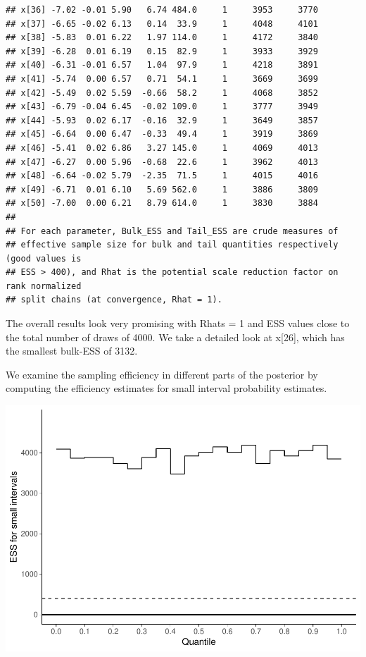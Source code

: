 \documentclass[american,]{article}
\begin{document}
\begin{verbatim}
## x[36] -7.02 -0.01 5.90   6.74 484.0     1     3953     3770
## x[37] -6.65 -0.02 6.13   0.14  33.9     1     4048     4101
## x[38] -5.83  0.01 6.22   1.97 114.0     1     4172     3840
## x[39] -6.28  0.01 6.19   0.15  82.9     1     3933     3929
## x[40] -6.31 -0.01 6.57   1.04  97.9     1     4218     3891
## x[41] -5.74  0.00 6.57   0.71  54.1     1     3669     3699
## x[42] -5.49  0.02 5.59  -0.66  58.2     1     4068     3852
## x[43] -6.79 -0.04 6.45  -0.02 109.0     1     3777     3949
## x[44] -5.93  0.02 6.17  -0.16  32.9     1     3649     3857
## x[45] -6.64  0.00 6.47  -0.33  49.4     1     3919     3869
## x[46] -5.41  0.02 6.86   3.27 145.0     1     4069     4013
## x[47] -6.27  0.00 5.96  -0.68  22.6     1     3962     4013
## x[48] -6.64 -0.02 5.79  -2.35  71.5     1     4015     4016
## x[49] -6.71  0.01 6.10   5.69 562.0     1     3886     3809
## x[50] -7.00  0.00 6.21   8.79 614.0     1     3830     3884
## 
## For each parameter, Bulk_ESS and Tail_ESS are crude measures of 
## effective sample size for bulk and tail quantities respectively (good values is 
## ESS > 400), and Rhat is the potential scale reduction factor on rank normalized
## split chains (at convergence, Rhat = 1).
\end{verbatim}

The overall results look very promising with Rhats = 1 and ESS values
close to the total number of draws of 4000. We take a detailed look at
x{[}26{]}, which has the smallest bulk-ESS of 3132.

We examine the sampling efficiency in different parts of the posterior
by computing the efficiency estimates for small interval probability
estimates.

\includegraphics{graphics/local-ess-jags-nom-1.pdf}
\end{document}
